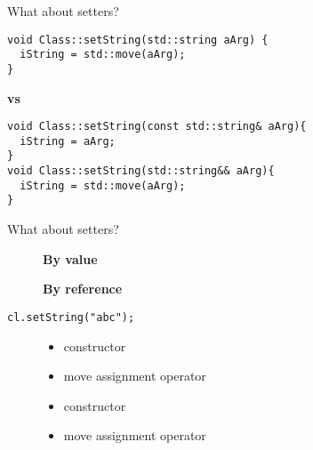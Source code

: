 \documentclass{beamer}
\begin{document}
\begin{frame}[fragile]{What about setters?}
\begin{lstlisting}[style=customcpp]
void Class::setString(std::string aArg) {
  iString = std::move(aArg);
}
\end{lstlisting}
\textbf{vs}
\begin{lstlisting}[style=customcpp]
void Class::setString(const std::string& aArg){
  iString = aArg;
}
void Class::setString(std::string&& aArg){
  iString = std::move(aArg);
}
\end{lstlisting}
\end{frame}


\begin{frame}[fragile]{What about setters? }
\begin{figure}[!htb]
    \centering
    \begin{minipage}{.5\textwidth}
        \centering
\textbf{By value}
    \end{minipage}%
    \begin{minipage}{0.5\textwidth}
        \centering
\textbf{By reference}
    \end{minipage}
    \end{figure}
    
\begin{lstlisting}[style=customcpp]
cl.setString("abc");
\end{lstlisting}

\begin{figure}[!htb]
    \centering
    \begin{minipage}{.5\textwidth}
        \centering
\begin{itemize}
\item constructor
\item move assignment operator
\end{itemize}
    \end{minipage}%
    \begin{minipage}{0.5\textwidth}
        \centering
\begin{itemize}
\item constructor
\item move assignment operator
\end{itemize}
    \end{minipage}
\end{figure}
    

\end{frame}
\end{document}
